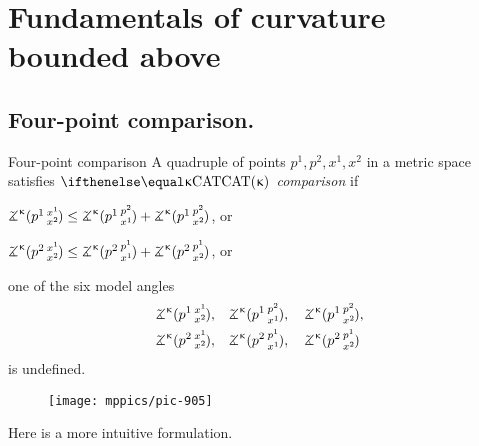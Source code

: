 \chapter{Fundamentals of curvature bounded above}

\section{Four-point comparison.} \label{sec:cba-def}

\index{$\CAT{}$}
\begin{thm}{Four-point comparison}\label{def:2+2}
A quadruple of points $p^1,p^2,x^1,x^2$ in a metric space 
satisfies 
\emph{$\CAT\kappa$ comparison}
if
  
\begin{subthm}{}
$\angk{\kappa}{p^1}{x^1}{x^2} 
\le 
\angk{\kappa}{p^1}{p^2}{x^1}+\angk{\kappa}{p^1}{p^2}{x^2}$, or
\end{subthm}

\begin{subthm}{}
$\angk{\kappa} {p^2}{x^1}{x^2}\le \angk{\kappa} {p^2}{p^1}{x^1} + \angk{\kappa} {p^2}{p^1}{x^2}$, or
\end{subthm}

\begin{subthm}{}
one of the six model angles 
\begin{align*}
\angk{\kappa}{p^1}{x^1}{x^2},\quad&\angk{\kappa}{p^1}{p^2}{x^1},\quad\angk{\kappa}{p^1}{p^2}{x^2},
\\
\angk{\kappa}{p^2}{x^1}{x^2},\quad&\angk{\kappa}{p^2}{p^1}{x^1},\quad\angk{\kappa}{p^2}{p^1}{x^2}
\end{align*}
is undefined.
\end{subthm}
\end{thm}

\begin{wrapfigure}{r}{30 mm}
\vskip-0mm
\centering
\texttt{[image: mppics/pic-905]}
\end{wrapfigure}

Here is a more intuitive formulation.


